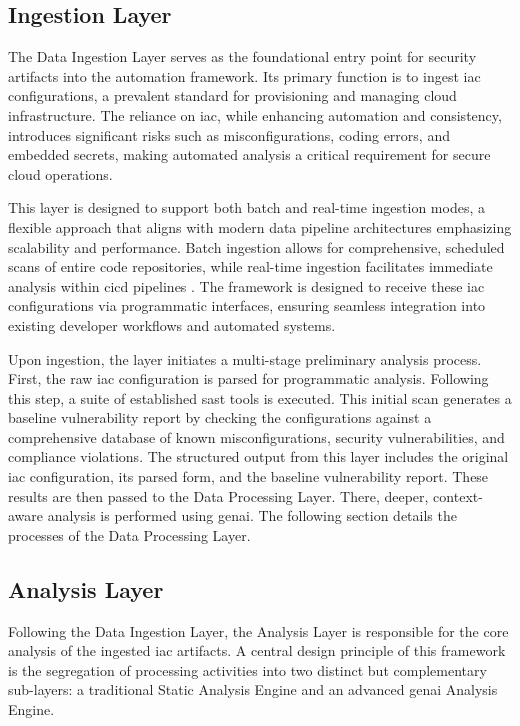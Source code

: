 \subsection{Ingestion Layer} %
\label{subsec:data-ingestion-layer}

The Data Ingestion Layer serves as the foundational entry point for security artifacts into the automation framework. Its primary function is to ingest \gls{iac} configurations, a prevalent standard for provisioning and managing cloud infrastructure. The reliance on \gls{iac}, while enhancing automation and consistency, introduces significant risks such as misconfigurations, coding errors, and embedded secrets, making automated analysis a critical requirement for secure cloud operations.

This layer is designed to support both batch and real-time ingestion modes, a flexible approach that aligns with modern data pipeline architectures emphasizing scalability and performance\cite{alevizos_towards_2024}. Batch ingestion allows for comprehensive, scheduled scans of entire code repositories, while real-time ingestion facilitates immediate analysis within \gls{cicd} pipelines \cite{gunathilaka_context-aware_2025}. The framework is designed to receive these \gls{iac} configurations via programmatic interfaces, ensuring seamless integration into existing developer workflows and automated systems.

Upon ingestion, the layer initiates a multi-stage preliminary analysis process. First, the raw \gls{iac} configuration is parsed for programmatic analysis. Following this step, a suite of established \gls{sast} tools is executed. This initial scan generates a baseline vulnerability report by checking the configurations against a comprehensive database of known misconfigurations, security vulnerabilities, and compliance violations. The structured output from this layer includes the original \gls{iac} configuration, its parsed form, and the baseline vulnerability report. These results are then passed to the Data Processing Layer. There, deeper, context-aware analysis is performed using \gls{genai}. The following section details the processes of the Data Processing Layer.

\subsection{Analysis Layer}
\label{subsec:analysis-layer}

Following the Data Ingestion Layer, the Analysis Layer is responsible for the core analysis of the ingested \gls{iac} artifacts. A central design principle of this framework is the segregation of processing activities into two distinct but complementary sub-layers: a traditional Static Analysis Engine and an advanced \gls{genai} Analysis Engine.

